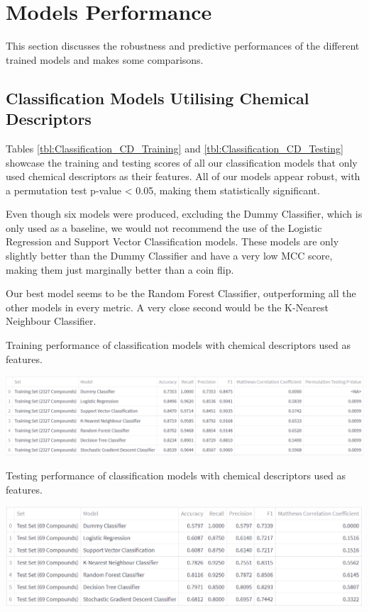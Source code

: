\section{Models Performance}

This section discusses the robustness and predictive performances of the different trained models and makes some comparisons.

\subsection{Classification Models Utilising Chemical Descriptors}
\label{subsec:Classification_CD}

Tables \ref{tbl:Classification_CD_Training} and \ref{tbl:Classification_CD_Testing} showcase the training and testing scores of all our classification models that only used chemical descriptors as their features. All of our models appear robust, with a permutation test p-value < 0.05, making them statistically significant. 

Even though six models were produced, excluding the Dummy Classifier, which is only used as a baseline, we would not recommend the use of the Logistic Regression and Support Vector Classification models. These models are only slightly better than the Dummy Classifier and have a very low MCC score, making them just marginally better than a coin flip.

Our best model seems to be the Random Forest Classifier, outperforming all the other models in every metric. A very close second would be the K-Nearest Neighbour Classifier.

\begin{table}
  \caption{Training performance of classification models with chemical descriptors used as features.}
  \label{tbl:Classification_CD_Training}
  \includegraphics[width=1.0\linewidth]{images/Classification CD Training.pdf}
\end{table}

\begin{table}
  \caption{Testing performance of classification models with chemical descriptors used as features.}
  \label{tbl:Classification_CD_Testing}
  \includegraphics[width=1.0\linewidth]{images/Classification CD Testing.pdf}
\end{table}

